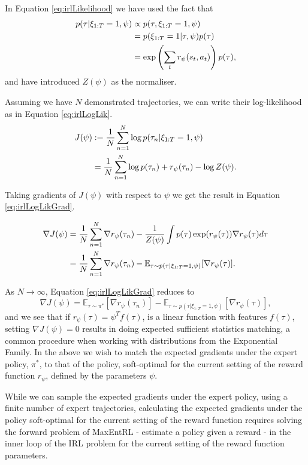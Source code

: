 \documentclass{report}
\numberwithin{equation}{section}
\numberwithin{figure}{section}
\numberwithin{table}{section}
\numberwithin{algorithm}{section}
\begin{document}
In Equation \ref{eq:irlLikelihood} we have used the fact that 
\begin{align*}
  p(\tau|\xi_{1:T}=1,\psi)&\propto p(\tau,\xi_{1:T}=1,\psi)\notag\\
  &=p(\xi_{1:T}=1|\tau,\psi)p(\tau)\notag\\
  &=\exp\left(
    \sum_t r_\psi(s_t, a_t)
  \right)p(\tau),
\end{align*}
and have introduced $Z(\psi)$ as the normaliser.

Assuming we have $N$ demonstrated trajectories, we can write their 
log-likelihood as in Equation \ref{eq:irlLogLik}.
\begin{align}\label{eq:irlLogLik}
  J(\psi)&:=\frac{1}{N}\sum_{n=1}^N \log p(\tau_n|\xi_{1:T}=1,\psi)\notag\\
  &=\frac{1}{N}\sum_{n=1}^N \log p(\tau_n) + r_\psi (\tau_n) - \log Z(\psi).
\end{align}

Taking gradients of $J(\psi)$ with respect to $\psi$ we get the 
result in Equation \ref{eq:irlLogLikGrad}.

\begin{align}\label{eq:irlLogLikGrad}
  \nabla J(\psi)&=\frac{1}{N}\sum_{n=1}^N \nabla r_\psi(\tau_n) - \frac{1}{Z(\psi)}\int p(\tau)\exp(r_\psi(\tau))\nabla r_\psi(\tau)d\tau\notag\\
  &=\frac{1}{N}\sum_{n=1}^N \nabla r_\psi(\tau_n) - \mathbb{E}_{\tau\sim p(\tau|\xi_{1:T}=1,\psi)}[\nabla r_\psi(\tau)].
\end{align}

As $N\rightarrow \infty$, Equation \ref{eq:irlLogLikGrad} reduces 
to 
\begin{equation*}
  \nabla J(\psi)=\mathbb{E}_{\tau\sim \pi^*}[\nabla r_\psi(\tau_n)] - \mathbb{E}_{\tau\sim p(\tau|\xi_{1:T}=1,\psi)}[\nabla r_\psi(\tau)],
\end{equation*}
and we see that if $r_\psi(\tau)=\psi^Tf(\tau)$, is a linear function 
with features $f(\tau)$, setting $\nabla J(\psi)=0$ results in doing 
expected sufficient statistics matching, a common procedure 
when working with distributions from the Exponential Family. 
In the above we wish to match the expected gradients under 
the expert policy, $\pi^*$, to that of the policy, soft-optimal for 
the current setting of the reward function $r_\psi$, defined by 
the parameters $\psi$.

While we can sample the expected gradients under the expert 
policy, using a finite number of expert trajectories, calculating 
the expected gradients under the policy soft-optimal for the current 
setting of the reward function requires solving the forward 
problem of MaxEntRL - estimate a policy given a reward - in the 
inner loop of the IRL problem for the current setting of the 
reward function parameters.
\end{document}
